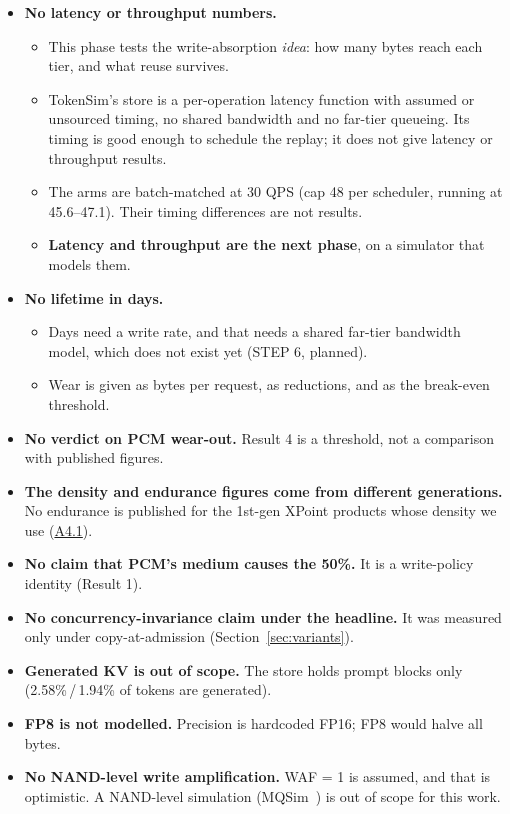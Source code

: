 \documentclass[11pt,a4paper]{article}
\begin{document}
\begin{itemize}
  \item \textbf{No latency or throughput numbers.}
  \begin{itemize}
    \item This phase tests the write-absorption \emph{idea}: how many bytes
      reach each tier, and what reuse survives.
    \item TokenSim's store is a per-operation latency function with assumed
      or unsourced timing, no shared bandwidth and no far-tier queueing. Its
      timing is good enough to schedule the replay; it does not give latency
      or throughput results.
    \item The arms are batch-matched at 30 QPS (cap 48 per scheduler,
      running at 45.6--47.1). Their timing differences are not results.
    \item \textbf{Latency and throughput are the next phase}, on a simulator
      that models them.
  \end{itemize}
  \item \textbf{No lifetime in days.}
  \begin{itemize}
    \item Days need a write rate, and that needs a shared far-tier bandwidth
      model, which does not exist yet (STEP 6, planned).
    \item Wear is given as bytes per request, as reductions, and as the
      break-even threshold.
  \end{itemize}
  \item \textbf{No verdict on PCM wear-out.} Result 4 is a threshold, not a
    comparison with published figures.
  \item \textbf{The density and endurance figures come from different
    generations.} No endurance is published for the 1st-gen XPoint products
    whose density we use (\hyperref[sec:lit]{A4.1}).
  \item \textbf{No claim that PCM's medium causes the 50\%.} It is a
    write-policy identity (Result 1).
  \item \textbf{No concurrency-invariance claim under the headline.} It was
    measured only under copy-at-admission (Section~\ref{sec:variants}).
  \item \textbf{Generated KV is out of scope.} The store holds prompt blocks
    only (2.58\%\,/\,1.94\% of tokens are generated).
  \item \textbf{FP8 is not modelled.} Precision is hardcoded FP16; FP8 would
    halve all bytes.
  \item \textbf{No NAND-level write amplification.} WAF = 1 is assumed, and
    that is optimistic. A NAND-level simulation (MQSim~\cite{mqsim}) is out
    of scope for this work.
\end{itemize}
\end{document}
